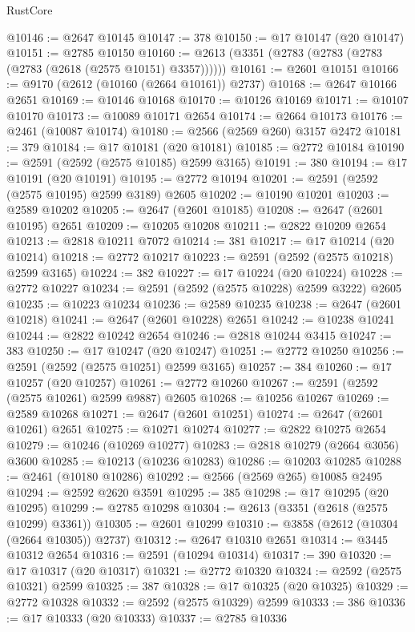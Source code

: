 \begin{lexlean}{RustCore}
\begin{coremodule}
@10146 := @2647 @10145
@10147 := 378
@10150 := @17 @10147 (@20 @10147)
@10151 := @2785 @10150
@10160 := @2613 (@3351 (@2783 (@2783 (@2783 (@2783 (@2618 (@2575 @10151) @3357))))))
@10161 := @2601 @10151
@10166 := @9170 (@2612 (@10160 (@2664 @10161)) @2737)
@10168 := @2647 @10166 @2651
@10169 := @10146 @10168
@10170 := @10126 @10169
@10171 := @10107 @10170
@10173 := @10089 @10171 @2654
@10174 := @2664 @10173
@10176 := @2461 (@10087 @10174)
@10180 := @2566 (@2569 @260) @3157 @2472
@10181 := 379
@10184 := @17 @10181 (@20 @10181)
@10185 := @2772 @10184
@10190 := @2591 (@2592 (@2575 @10185) @2599 @3165)
@10191 := 380
@10194 := @17 @10191 (@20 @10191)
@10195 := @2772 @10194
@10201 := @2591 (@2592 (@2575 @10195) @2599 @3189) @2605
@10202 := @10190 @10201
@10203 := @2589 @10202
@10205 := @2647 (@2601 @10185)
@10208 := @2647 (@2601 @10195) @2651
@10209 := @10205 @10208
@10211 := @2822 @10209 @2654
@10213 := @2818 @10211 @7072
@10214 := 381
@10217 := @17 @10214 (@20 @10214)
@10218 := @2772 @10217
@10223 := @2591 (@2592 (@2575 @10218) @2599 @3165)
@10224 := 382
@10227 := @17 @10224 (@20 @10224)
@10228 := @2772 @10227
@10234 := @2591 (@2592 (@2575 @10228) @2599 @3222) @2605
@10235 := @10223 @10234
@10236 := @2589 @10235
@10238 := @2647 (@2601 @10218)
@10241 := @2647 (@2601 @10228) @2651
@10242 := @10238 @10241
@10244 := @2822 @10242 @2654
@10246 := @2818 @10244 @3415
@10247 := 383
@10250 := @17 @10247 (@20 @10247)
@10251 := @2772 @10250
@10256 := @2591 (@2592 (@2575 @10251) @2599 @3165)
@10257 := 384
@10260 := @17 @10257 (@20 @10257)
@10261 := @2772 @10260
@10267 := @2591 (@2592 (@2575 @10261) @2599 @9887) @2605
@10268 := @10256 @10267
@10269 := @2589 @10268
@10271 := @2647 (@2601 @10251)
@10274 := @2647 (@2601 @10261) @2651
@10275 := @10271 @10274
@10277 := @2822 @10275 @2654
@10279 := @10246 (@10269 @10277)
@10283 := @2818 @10279 (@2664 @3056) @3600
@10285 := @10213 (@10236 @10283)
@10286 := @10203 @10285
@10288 := @2461 (@10180 @10286)
@10292 := @2566 (@2569 @265) @10085 @2495
@10294 := @2592 @2620 @3591
@10295 := 385
@10298 := @17 @10295 (@20 @10295)
@10299 := @2785 @10298
@10304 := @2613 (@3351 (@2618 (@2575 @10299) @3361))
@10305 := @2601 @10299
@10310 := @3858 (@2612 (@10304 (@2664 @10305)) @2737)
@10312 := @2647 @10310 @2651
@10314 := @3445 @10312 @2654
@10316 := @2591 (@10294 @10314)
@10317 := 390
@10320 := @17 @10317 (@20 @10317)
@10321 := @2772 @10320
@10324 := @2592 (@2575 @10321) @2599
@10325 := 387
@10328 := @17 @10325 (@20 @10325)
@10329 := @2772 @10328
@10332 := @2592 (@2575 @10329) @2599
@10333 := 386
@10336 := @17 @10333 (@20 @10333)
@10337 := @2785 @10336

\end{coremodule}
\end{lexlean}
